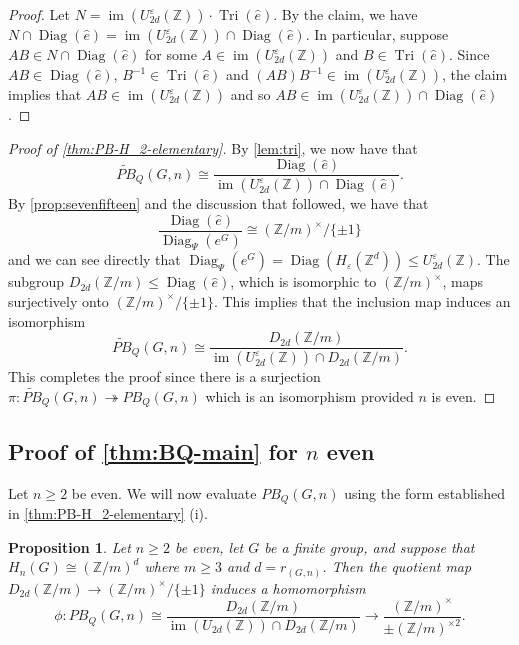 \documentclass[11pt,a4paper,leqno]{amsart}
\newtheorem{proposition}[theorem]{Proposition}
\theoremstyle{definition}
\theoremstyle{remark}
\newcommand{\wh}{\widehat}
\newcommand{\wt}{\widetilde}
\newcommand{\cy}[1]{\Z/{#1}}
\newcommand{\Z}{\mathbb{Z}}
\DeclareMathOperator{\IM}{im}
\DeclareMathOperator{\DiagIsom}{Diag}
\DeclareMathOperator{\TriIsom}{Tri}
\newcommand{\ep}{\varepsilon}
\newcommand{\U}{U^{\varepsilon}}
\begin{document}
\begin{proof}
Let $N = \IM{(\U_{2d}(\Z))} \cdot \TriIsom(\wh e)$.
By the claim, we have $N \cap \DiagIsom(\wh e) = \IM{(\U_{2d}(\Z))} \cap \DiagIsom(\wh e)$. In particular, suppose $AB \in N \cap \DiagIsom(\wh e)$ for some $A \in  \IM{(\U_{2d}(\Z))}$ and $B \in \TriIsom(\wh e)$. Since $AB \in \DiagIsom(\wh e)$, $B^{-1} \in \TriIsom(\wh e)$ and $(AB) B^{-1} \in  \IM{(\U_{2d}(\Z))}$, the claim implies that $AB \in  \IM{(\U_{2d}(\Z))}$ and so $AB \in \IM{(\U_{2d}(\Z))} \cap \DiagIsom(\wh e)$.
\end{proof}

\begin{proof}[Proof of \cref{thm:PB-H_2-elementary}]
By \cref{lem:tri}, we now have that
\[ \wt{PB}_Q(G,n) \cong \frac{\DiagIsom(\wh e)}{\IM(\U_{2d}(\Z)) \cap \DiagIsom(\wh e)}. \]
By \cref{prop:sevenfifteen} and the discussion that followed, we have that
\[ \frac{\DiagIsom(\wh e)}{\DiagIsom_{\Psi}(e^G)} \cong (\Z/m)^\times /\{\pm 1\} \]
and we can see directly that $\DiagIsom_{\Psi}(e^G) = \DiagIsom(H_\ep(\Z^d)) \le \U_{2d}(\Z)$.
The subgroup $D_{2d}(\Z/m) \le \DiagIsom(\wh e)$, which is isomorphic to $(\Z/m)^\times$, maps surjectively onto $(\Z/m)^\times/\{\pm 1\}$. This implies that the inclusion map induces an isomorphism
\[ \wt{PB}_Q(G,n) \cong \frac{D_{2d}(\Z/m)}{\IM(\U_{2d}(\Z)) \cap D_{2d}(\Z/m)}.\]  
This completes the proof since there is a surjection $\pi\colon \wt{PB}_Q(G,n) \twoheadrightarrow PB_Q(G,n)$ which is an isomorphism provided $n$ is even.
\end{proof}

\subsection{Proof of \cref{thm:BQ-main} for $n$ even} \label{ss:proof-n-even}

Let $n \ge 2$ be even. We will now evaluate $PB_Q(G,n)$ using the form established in \cref{thm:PB-H_2-elementary} (i). 

\begin{proposition} \label{prop:hom-to-Lgroups}
Let $n \ge 2$ be even, let $G$ be a finite group, and suppose that $H_n(G) \cong (\Z/m)^d$ where $m \ge 3$ and $d = r_{(G,n)}$.
Then the quotient map $ D_{2d}(\Z/m) \to (\Z/m)^\times/\{\pm 1\} $ induces a homomorphism 
\[\phi\colon PB_Q(G,n) \cong
 \frac{D_{2d}(\Z/m)}{\IM(U_{2d}(\Z)) \cap D_{2d}(\Z/m)} \longrightarrow
  \frac{(\Z/m)^\times}{\pm (\cy m)^{\times 2}}.  \]
\end{proposition}
\end{document}
